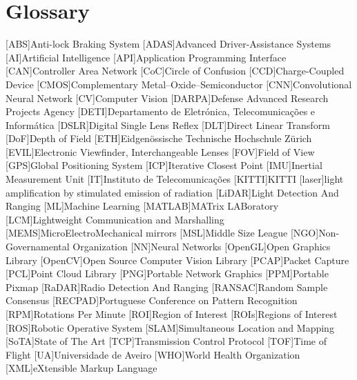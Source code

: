\chapter{Glossary}

\footnotesize
\SingleSpacing

\begin{multicols}{2} 
\begin{acronym}[AAAAAA]
	[ABS]{Anti-lock Braking System}
	[ADAS]{Advanced Driver-Assistance Systems}
	[AI]{Artificial Intelligence}
	[API]{Application Programming Interface}
	[CAN]{Controller Area Network} 
	[CoC]{Circle of Confusion}
	[CCD]{Charge-Coupled Device}
	[CMOS]{Complementary Metal–Oxide–Semiconductor}
	[CNN]{Convolutional Neural Network}
	[CV]{Computer Vision}
	[DARPA]{Defense Advanced Research Projects Agency}
	[DETI]{Departamento de Eletrónica, Telecomunicações e Informática}
	[DSLR]{Digital Single Lens Reflex}
	[DLT]{Direct Linear Transform}
	[DoF]{Depth of Field}
	[ETH]{Eidgenössische Technische Hochschule Zürich}
	[EVIL]{Electronic Viewfinder, Interchangeable Lenses}
	[FOV]{Field of View}
	[GPS]{Global Positioning System}
	[ICP]{Iterative Closest Point}
	[IMU]{Inertial Measurement Unit}
	[IT]{Instituto de Telecomunicações}
	[KITTI]{KITTI}
	[laser]{light amplification by stimulated emission of radiation}
	[LiDAR]{Light Detection And Ranging}
	[ML]{Machine Learning}
	[MATLAB\textsuperscript{\tiny\textregistered}]{MATrix LABoratory\textsuperscript{\tiny\textregistered}}
	[LCM]{Lightweight Communication and Marshalling}
	[MEMS]{MicroElectroMechanical mirrors}
	[MSL]{Middle Size League}
	[NGO]{Non-Governamental Organization} 
	[NN]{Neural Networks}
	[OpenGL]{Open Graphics Library}
	[OpenCV]{Open Source Computer Vision Library}
	[PCAP]{Packet Capture}
	[PCL]{Point Cloud Library}
	[PNG]{Portable Network Graphics}
	[PPM]{Portable Pixmap}
	[RaDAR]{Radio Detection And Ranging}
	[RANSAC]{Random Sample Consensus}
	[RECPAD]{Portuguese Conference on Pattern Recognition}
	[RPM]{Rotations Per Minute}
	[ROI]{Region of Interest}
	[ROIs]{Regions of Interest}
	[ROS]{Robotic Operative System} 
	[SLAM]{Simultaneous Location and Mapping} 
	[SoTA]{State of The Art}
	[TCP]{Transmission Control Protocol}
	[TOF]{Time of Flight} 
	[UA]{Universidade de Aveiro}
	[WHO]{World Health Organization}
	[XML]{eXtensible Markup Language}
\end{acronym}
\end{multicols}

